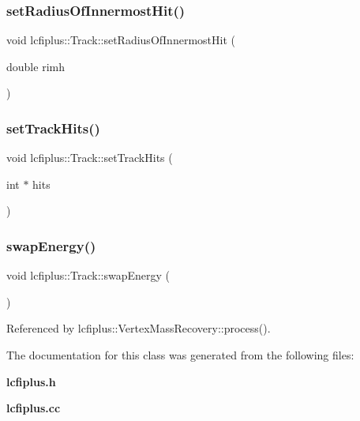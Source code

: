 \subsubsection{set\+Radius\+Of\+Innermost\+Hit()}
{\footnotesize\ttfamily void lcfiplus\+::\+Track\+::set\+Radius\+Of\+Innermost\+Hit (\begin{DoxyParamCaption}\item[{double}]{rimh }\end{DoxyParamCaption})\hspace{0.3cm}{\ttfamily [inline]}}

\mbox{\label{classlcfiplus_1_1Track_a05fbbf86252355b799be89963446e286}} 
\subsubsection{set\+Track\+Hits()}
{\footnotesize\ttfamily void lcfiplus\+::\+Track\+::set\+Track\+Hits (\begin{DoxyParamCaption}\item[{int $\ast$}]{hits }\end{DoxyParamCaption})\hspace{0.3cm}{\ttfamily [inline]}}

\mbox{\label{classlcfiplus_1_1Track_a17c8c84ff83b4fb347c4e7e973f1769a}} 
\subsubsection{swap\+Energy()}
{\footnotesize\ttfamily void lcfiplus\+::\+Track\+::swap\+Energy (\begin{DoxyParamCaption}{ }\end{DoxyParamCaption})\hspace{0.3cm}{\ttfamily [inline]}}



Referenced by lcfiplus\+::\+Vertex\+Mass\+Recovery\+::process().



The documentation for this class was generated from the following files\+:\begin{DoxyCompactItemize}
\item 
\textbf{ lcfiplus.\+h}\item 
\textbf{ lcfiplus.\+cc}\end{DoxyCompactItemize}
